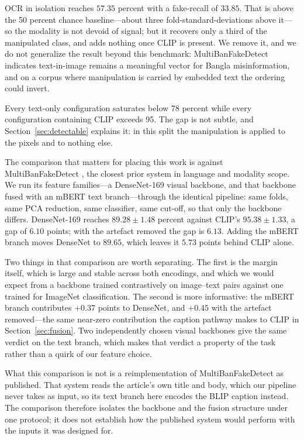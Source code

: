 \documentclass[journal]{IEEEtran}
\begin{document}
OCR in isolation reaches $57.35$ percent with a fake-recall of $33.85$. That is
above the 50 percent chance baseline---about three fold-standard-deviations
above it---so the modality is not devoid of signal; but it recovers only a
third of the manipulated class, and adds nothing once CLIP is present. We
remove it, and we do not generalize the result beyond this benchmark:
MultiBanFakeDetect \cite{multibanfake} indicates text-in-image remains a
meaningful vector for Bangla misinformation, and on a corpus where
manipulation is carried by embedded text the ordering could invert.

Every text-only configuration saturates below 78 percent while every
configuration containing CLIP exceeds 95. The gap is not subtle, and
Section~\ref{sec:detectable} explains it: in this split the manipulation is
applied to the pixels and to nothing else.

The comparison that matters for placing this work is against
MultiBanFakeDetect \cite{multibanfake}, the closest prior system in language
and modality scope. We run its feature families---a DenseNet-169 visual
backbone, and that backbone fused with an mBERT text branch---through the
identical pipeline: same folds, same PCA reduction, same classifier, same
cut-off, so that only the backbone differs. DenseNet-169 reaches
$89.28 \pm 1.48$ percent against CLIP's $95.38 \pm 1.33$, a gap of $6.10$
points; with the artefact removed the gap is $6.13$. Adding the mBERT branch
moves DenseNet to $89.65$, which leaves it $5.73$ points behind CLIP alone.

Two things in that comparison are worth separating. The first is the margin
itself, which is large and stable across both encodings, and which we would
expect from a backbone trained contrastively on image--text pairs against one
trained for ImageNet classification. The second is more informative: the mBERT
branch contributes $+0.37$ points to DenseNet, and $+0.45$ with the artefact
removed---the same near-zero contribution the caption pathway makes to CLIP in
Section~\ref{sec:fusion}. Two independently chosen visual backbones give the
same verdict on the text branch, which makes that verdict a property of the
task rather than a quirk of our feature choice.

What this comparison is not is a reimplementation of MultiBanFakeDetect as
published. That system reads the article's own title and body, which our
pipeline never takes as input, so its text branch here encodes the BLIP caption
instead. The comparison therefore isolates the backbone and the fusion
structure under one protocol; it does not establish how the published system
would perform with the inputs it was designed for.
\end{document}
